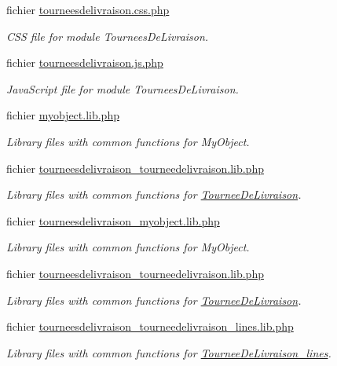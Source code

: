 \begin{DoxyCompactItemize}
fichier \hyperlink{tourneesdelivraison_8css_8php}{tourneesdelivraison.\+css.\+php}
\begin{DoxyCompactList}\small\item\em C\+SS file for module Tournees\+De\+Livraison. \end{DoxyCompactList}\item 
fichier \hyperlink{tourneesdelivraison_8js_8php}{tourneesdelivraison.\+js.\+php}
\begin{DoxyCompactList}\small\item\em Java\+Script file for module Tournees\+De\+Livraison. \end{DoxyCompactList}\item 
fichier \hyperlink{myobject_8lib_8php}{myobject.\+lib.\+php}
\begin{DoxyCompactList}\small\item\em Library files with common functions for My\+Object. \end{DoxyCompactList}\item 
fichier \hyperlink{tourneesdelivraison__tourneedelivraison_8lib_8php}{tourneesdelivraison\+\_\+tourneedelivraison.\+lib.\+php}
\begin{DoxyCompactList}\small\item\em Library files with common functions for \hyperlink{classTourneeDeLivraison}{Tournee\+De\+Livraison}. \end{DoxyCompactList}\item 
fichier \hyperlink{tourneesdelivraison__myobject_8lib_8php}{tourneesdelivraison\+\_\+myobject.\+lib.\+php}
\begin{DoxyCompactList}\small\item\em Library files with common functions for My\+Object. \end{DoxyCompactList}\item 
fichier \hyperlink{tourneesdelivraison__tourneedelivraison_8lib_8php}{tourneesdelivraison\+\_\+tourneedelivraison.\+lib.\+php}
\begin{DoxyCompactList}\small\item\em Library files with common functions for \hyperlink{classTourneeDeLivraison}{Tournee\+De\+Livraison}. \end{DoxyCompactList}\item 
fichier \hyperlink{tourneesdelivraison__tourneedelivraison__lines_8lib_8php}{tourneesdelivraison\+\_\+tourneedelivraison\+\_\+lines.\+lib.\+php}
\begin{DoxyCompactList}\small\item\em Library files with common functions for \hyperlink{classTourneeDeLivraison__lines}{Tournee\+De\+Livraison\+\_\+lines}. \end{DoxyCompactList}\item 

\end{DoxyCompactItemize}
